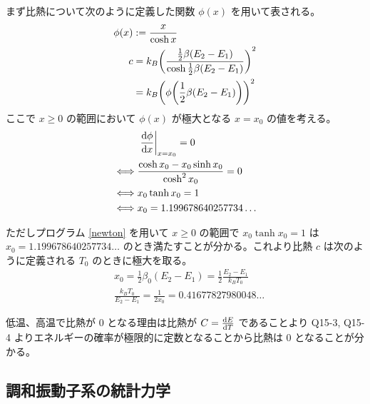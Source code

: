 \documentclass[uplatex,dvipdfmx,a4paper,11pt]{jlreq}
\theoremstyle{definition}
\begin{document}
まず比熱について次のように定義した関数 $\phi(x)$ を用いて表される。
\begin{align}
  \phi(x) & := \frac{x}{\cosh x}                                                              \\
  c       & = k_B\qty(\frac{\frac{1}{2}\beta(E_2 - E_1)}{\cosh\frac{1}{2}\beta(E_2 - E_1)})^2 \\
          & = k_B\qty(\phi\qty(\frac{1}{2}\beta(E_2 - E_1)))^2
\end{align}
ここで $x\geq 0$ の範囲において $\phi(x)$ が極大となる $x = x_0$ の値を考える。
\begin{align}
       & \left.\dv{\phi}{x}\right|_{x = x_0} = 0          \\
  \iff & \frac{\cosh x_0 - x_0\sinh x_0}{\cosh^2 x_0} = 0 \\
  \iff & x_0\tanh x_0 = 1                                 \\
  \iff & x_0 = 1.199678640257734\ldots
\end{align}

ただしプログラム \ref{newton} を用いて $x\geq 0$ の範囲で $x_0\tanh x_0 = 1$ は $x_0 = 1.199678640257734\ldots$ のとき満たすことが分かる。これより比熱 $c$ は次のように定義される $T_0$ のときに極大を取る。
\begin{align}
   & x_0 = \frac{1}{2}\beta_0(E_2 - E_1) = \frac{1}{2}\frac{E_2 - E_1}{k_BT_0} \\
   & \frac{k_BT_0}{E_2 - E_1} = \frac{1}{2x_0} =  0.41677827980048\ldots
\end{align}

低温、高温で比熱が 0 となる理由は比熱が $C = \dv{E}{T}$ であることより Q15-3, Q15-4 よりエネルギーの確率が極限的に定数となることから比熱は 0 となることが分かる。

\subsection{調和振動子系の統計力学}
\end{document}
